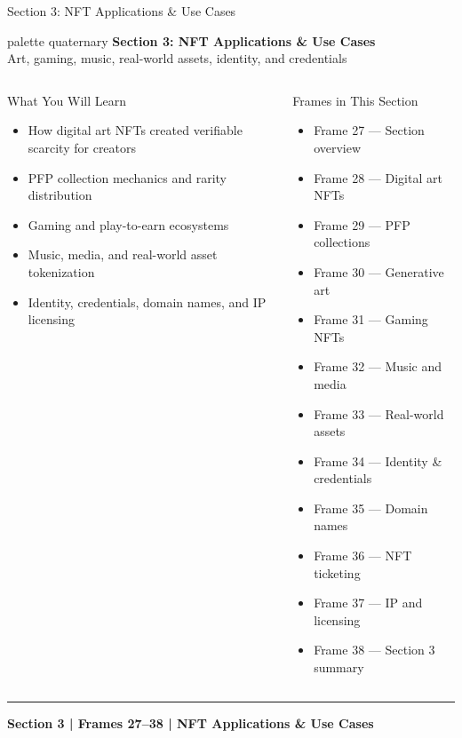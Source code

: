 \documentclass[8pt,aspectratio=169]{beamer}
\newcommand{\bottomnote}[1]{\vfill\vspace{-2mm}\textcolor{mllavender2}{\rule{\textwidth}{0.4pt}}\vspace{1mm}\footnotesize\textbf{#1}}
\begin{document}
\begin{frame}{Section 3: NFT Applications \& Use Cases}
\begin{beamercolorbox}[sep=12pt,center,rounded=true,shadow=true]{palette quaternary}
  {\Large\bfseries Section 3: NFT Applications \& Use Cases}\\[4pt]
  {\normalsize Art, gaming, music, real-world assets, identity, and credentials}
\end{beamercolorbox}

\vspace{4mm}
\begin{columns}[T]
\begin{block}{What You Will Learn}
\begin{itemize}\setlength{\itemsep}{2pt}
  \item How digital art NFTs created verifiable scarcity for creators
  \item PFP collection mechanics and rarity distribution
  \item Gaming and play-to-earn ecosystems
  \item Music, media, and real-world asset tokenization
  \item Identity, credentials, domain names, and IP licensing
\end{itemize}
\end{block}
\begin{block}{Frames in This Section}
\begin{itemize}\setlength{\itemsep}{1pt}
  \item Frame 27 --- Section overview
  \item Frame 28 --- Digital art NFTs
  \item Frame 29 --- PFP collections
  \item Frame 30 --- Generative art
  \item Frame 31 --- Gaming NFTs
  \item Frame 32 --- Music and media
  \item Frame 33 --- Real-world assets
  \item Frame 34 --- Identity \& credentials
  \item Frame 35 --- Domain names
  \item Frame 36 --- NFT ticketing
  \item Frame 37 --- IP and licensing
  \item Frame 38 --- Section 3 summary
\end{itemize}
\end{block}
\end{columns}
\bottomnote{Section 3 | Frames 27--38 | NFT Applications \& Use Cases}
\end{frame}
\end{document}

